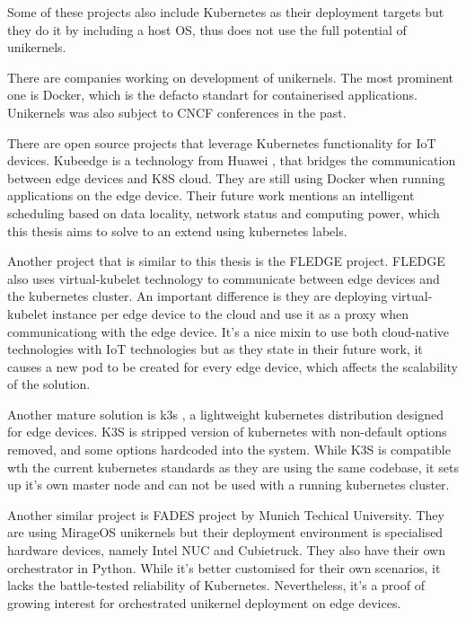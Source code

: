 Some of these projects also include Kubernetes as their deployment targets but they do it by including a host OS, thus does not use the full potential of unikernels.

There are companies working on development of unikernels. The most prominent one is Docker, which is the defacto standart for containerised applications. \cite{francia_2016} Unikernels was also subject to CNCF conferences in the past.


There are open source projects that leverage Kubernetes functionality for IoT devices. Kubeedge \cite{kubeedge} is a technology from Huawei , that bridges the communication between edge devices and K8S cloud. They are still using Docker when running applications on the edge device. Their future work mentions an intelligent scheduling based on data locality, network status and computing power, which this thesis aims to solve to an extend using kubernetes labels.

Another project that is similar to this thesis is the FLEDGE project.\cite{fledge} FLEDGE also uses virtual-kubelet technology to communicate between edge devices and the kubernetes cluster. An important difference is they are deploying virtual-kubelet instance per edge device to the cloud and use it as a proxy when communicationg with the edge device. It's a nice mixin to use both cloud-native technologies with IoT technologies but as they state in their future work, it causes a new pod to be created for every edge device, which affects the scalability of the solution.

Another mature solution is k3s \cite{k3s}, a lightweight kubernetes distribution designed for edge devices. K3S is stripped version of kubernetes with non-default options removed, and some options hardcoded into the system. While K3S is compatible wth the current kubernetes standards as they are using the same codebase, it sets up it's own master node and can not be used with a running kubernetes cluster.

Another similar project is FADES \cite{fades} project by Munich Techical University. They are using MirageOS unikernels but their deployment environment is specialised hardware devices, namely Intel NUC and Cubietruck. They also have their own orchestrator in Python. While it's better customised for their own scenarios, it lacks the battle-tested reliability of Kubernetes. Nevertheless, it's a proof of growing interest for orchestrated unikernel deployment on edge devices.